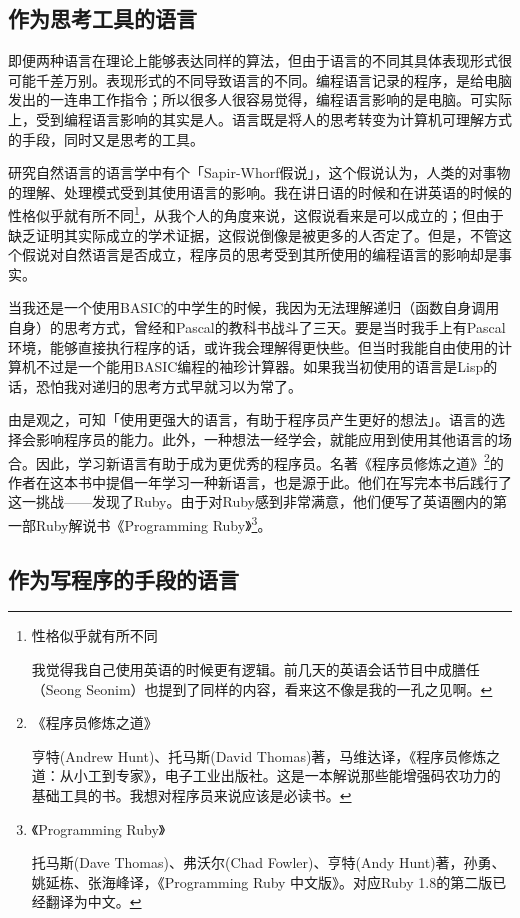 \documentclass[a4paper,12pt]{article}
\begin{document}
\subsection{作为思考工具的语言}

即便两种语言在理论上能够表达同样的算法，但由于语言的不同其具体表现形式很可能千差万别。表现形式的不同导致语言的不同。编程语言记录的程序，是给电脑发出的一连串工作指令；所以很多人很容易觉得，编程语言影响的是电脑。可实际上，受到编程语言影响的其实是人。语言既是将人的思考转变为计算机可理解方式的手段，同时又是思考的工具。

研究自然语言的语言学中有个「Sapir-Whorf假说」，这个假说认为，人类的对事物的理解、处理模式受到其使用语言的影响。我在讲日语的时候和在讲英语的时候的性格似乎就有所不同\footnote{性格似乎就有所不同

我觉得我自己使用英语的时候更有逻辑。前几天的英语会话节目中成膳任（Seong Seonim）也提到了同样的内容，看来这不像是我的一孔之见啊。}，从我个人的角度来说，这假说看来是可以成立的；但由于缺乏证明其实际成立的学术证据，这假说倒像是被更多的人否定了。但是，不管这个假说对自然语言是否成立，程序员的思考受到其所使用的编程语言的影响却是事实。

当我还是一个使用BASIC的中学生的时候，我因为无法理解递归（函数自身调用自身）的思考方式，曾经和Pascal的教科书战斗了三天。要是当时我手上有Pascal环境，能够直接执行程序的话，或许我会理解得更快些。但当时我能自由使用的计算机不过是一个能用BASIC编程的袖珍计算器。如果我当初使用的语言是Lisp的话，恐怕我对递归的思考方式早就习以为常了。

由是观之，可知「使用更强大的语言，有助于程序员产生更好的想法」。语言的选择会影响程序员的能力。此外，一种想法一经学会，就能应用到使用其他语言的场合。因此，学习新语言有助于成为更优秀的程序员。名著《程序员修炼之道》\footnote{《程序员修炼之道》

亨特(Andrew Hunt)、托马斯(David Thomas)著，马维达译，《程序员修炼之道：从小工到专家》，电子工业出版社。这是一本解说那些能增强码农功力的基础工具的书。我想对程序员来说应该是必读书。}的作者在这本书中提倡一年学习一种新语言，也是源于此。他们在写完本书后践行了这一挑战——发现了Ruby。由于对Ruby感到非常满意，他们便写了英语圈内的第一部Ruby解说书《Programming Ruby》\footnote{《Programming Ruby》

托马斯(Dave Thomas)、弗沃尔(Chad Fowler)、亨特(Andy Hunt)著，孙勇、姚延栋、张海峰译，《Programming Ruby 中文版》。对应Ruby 1.8的第二版已经翻译为中文。}。

\subsection{作为写程序的手段的语言}
\end{document}
